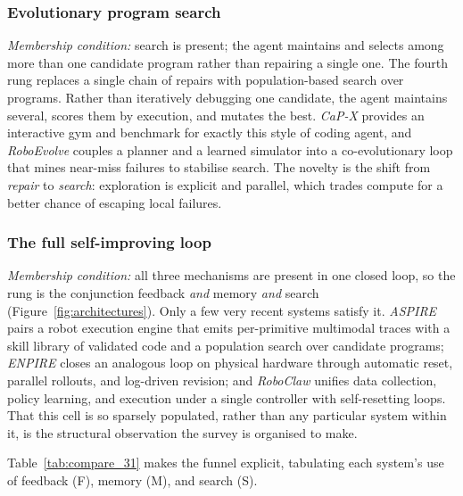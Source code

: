 \subsubsection{Evolutionary program search}
\label{ssec:search}
\emph{Membership condition:} search is present; the agent maintains and selects among more than
one candidate program rather than repairing a single one. The fourth rung replaces a single chain of repairs with population-based search over
programs. Rather than iteratively debugging one candidate, the agent maintains several,
scores them by execution, and mutates the best. \emph{CaP-X} \citep{capx} provides an
interactive gym and benchmark for exactly this style of coding agent, and \emph{RoboEvolve}
\citep{roboevolve} couples a planner and a learned simulator into a co-evolutionary loop
that mines near-miss failures to stabilise search. The novelty is the shift from
\emph{repair} to \emph{search}: exploration is explicit and parallel, which trades compute
for a better chance of escaping local failures.

\subsubsection{The full self-improving loop}
\label{ssec:fullloop}
\emph{Membership condition:} all three mechanisms are present in one closed loop, so the rung
is the conjunction feedback \emph{and} memory \emph{and} search (Figure~\ref{fig:architectures}).
Only a few very recent systems satisfy it. \emph{ASPIRE} \citep{aspire} pairs a robot execution
engine that emits per-primitive multimodal traces with a skill library of validated code and a
population search over candidate programs; \emph{ENPIRE} \citep{enpire} closes an analogous loop
on physical hardware through automatic reset, parallel rollouts, and log-driven revision; and
\emph{RoboClaw} \citep{roboclaw} unifies data collection, policy learning, and execution under a
single controller with self-resetting loops. That this cell is so sparsely populated, rather
than any particular system within it, is the structural observation the survey is organised to
make.

Table~\ref{tab:compare_31} makes the funnel explicit, tabulating each system's use of
feedback (F), memory (M), and search (S).

